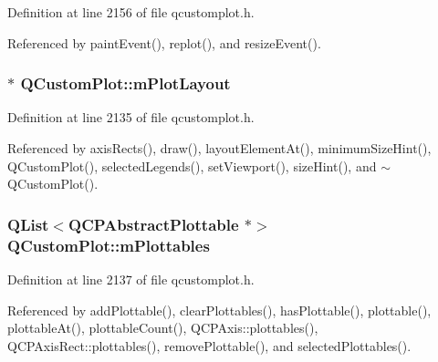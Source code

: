 Definition at line 2156 of file qcustomplot.\+h.



Referenced by paint\+Event(), replot(), and resize\+Event().

\hypertarget{class_q_custom_plot_ac97298756882a0eecd98151679850ac1}{}
\subsubsection[{m\+Plot\+Layout}]{$\ast$ Q\+Custom\+Plot\+::m\+Plot\+Layout\hspace{0.3cm}{\ttfamily [protected]}}\label{class_q_custom_plot_ac97298756882a0eecd98151679850ac1}


Definition at line 2135 of file qcustomplot.\+h.



Referenced by axis\+Rects(), draw(), layout\+Element\+At(), minimum\+Size\+Hint(), Q\+Custom\+Plot(), selected\+Legends(), set\+Viewport(), size\+Hint(), and $\sim$\+Q\+Custom\+Plot().

\hypertarget{class_q_custom_plot_a4b6c694fbdb2f201626f71eff2d1694e}{}
\subsubsection[{m\+Plottables}]{\setlength{\rightskip}{0pt plus 5cm}Q\+List$<${\bf Q\+C\+P\+Abstract\+Plottable} $\ast$$>$ Q\+Custom\+Plot\+::m\+Plottables\hspace{0.3cm}{\ttfamily [protected]}}\label{class_q_custom_plot_a4b6c694fbdb2f201626f71eff2d1694e}


Definition at line 2137 of file qcustomplot.\+h.



Referenced by add\+Plottable(), clear\+Plottables(), has\+Plottable(), plottable(), plottable\+At(), plottable\+Count(), Q\+C\+P\+Axis\+::plottables(), Q\+C\+P\+Axis\+Rect\+::plottables(), remove\+Plottable(), and selected\+Plottables().

\hypertarget{class_q_custom_plot_aa184197a6101a9cc5807469e1d006c9e}{}
